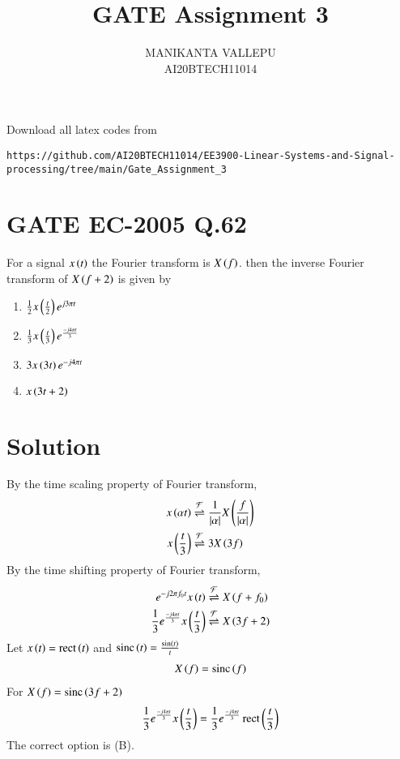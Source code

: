 \documentclass[journal,12pt,twocolumn]{IEEEtran}
\DeclareMathOperator{\sinc}{sinc}
\DeclareMathOperator{\rect}{rect}
\begin{document}
\makeatletter
{}
\makeatother
\let\StandardTheFigure\thefigure
\let\vec\mathbf
\renewcommand{\thefigure}{\theproblem}
\def\putbox#1#2#3{\makebox[0in][l]{\makebox[#1][l]{}\raisebox{\baselineskip}[0in][0in]{\raisebox{#2}[0in][0in]{#3}}}}
     \def\rightbox#1{\makebox[0in][r]{#1}}
     \def\centbox#1{\makebox[0in]{#1}}
     \def\topbox#1{\raisebox{-\baselineskip}[0in][0in]{#1}}
     \def\midbox#1{\raisebox{-0.5\baselineskip}[0in][0in]{#1}}
\vspace{3cm}
\title{GATE Assignment 3}
\author{MANIKANTA VALLEPU \\ AI20BTECH11014}
\maketitle
\newpage
\bigskip
\renewcommand{\thefigure}{\theenumi}
\renewcommand{\thetable}{\theenumi}
Download all latex codes from
\begin{lstlisting}
https://github.com/AI20BTECH11014/EE3900-Linear-Systems-and-Signal-processing/tree/main/Gate_Assignment_3
\end{lstlisting}
\section{GATE EC-2005 Q.62}
For a signal $x\left(t\right)$ the Fourier transform is $X\left(f\right)$. then the inverse Fourier transform of $X\left(f + 2\right)$ is given by
\begin{enumerate}[label={(\Alph*)}]
    \item $\frac{1}{2}x\left(\frac{t}{2}\right)e^{j3\pi t}$
    \item $\frac{1}{3}x\left(\frac{t}{3}\right)e^{\frac{-j4\pi t}{3}}$
    \item $3x\left(3t\right)e^{-j4\pi t}$
    \item $x\left(3t + 2\right)$
\end{enumerate}
\section*{Solution}
By the time scaling property of Fourier transform,
\begin{align}
    x\left(\alpha t\right)&\overset{\mathcal{F}}{ \rightleftharpoons}{\frac{1}{|\alpha|}}X\left(\frac{f}{|\alpha|}\right)\\
    x\left(\frac{t}{3}\right)&\overset{\mathcal{F}}{ \rightleftharpoons}{3}X\left(3f\right)
\end{align}
By the time shifting property of Fourier transform,
\begin{align}
    e^{-j2\pi f_0t}x\left(t\right)&\overset{\mathcal{F}}{ \rightleftharpoons}{X\left(f + f_0\right)}\\
   \frac{1}{3}e^{\frac{-j4\pi t}{3}}x\left(\frac{t}{3}\right)&\overset{\mathcal{F}}{ \rightleftharpoons}{X\left(3f + 2\right)}
\end{align}
Let $x\brak{t} = \rect{\brak{t}}$ and $\sinc\brak{t} = \frac{\sin\brak{t}}{t}$
\begin{align}
    X\brak{f} = \sinc\brak{f}
\end{align}
For $X\brak{f} = \sinc\brak{3f+2}$
\begin{align}
    \frac{1}{3}e^{\frac{-j4\pi t}{3}}x\brak{\frac{t}{3}} = \frac{1}{3}e^{\frac{-j4\pi t}{3}}\rect{\brak{\frac{t}{3}}}
\end{align}
The correct option is (B).
\end{document}
